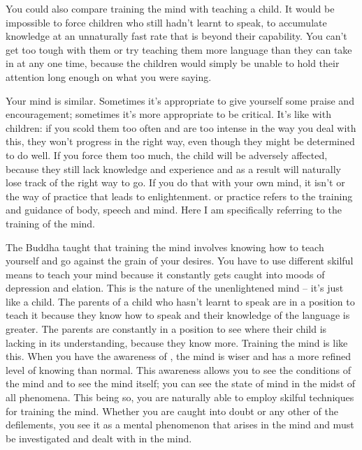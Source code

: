 You could also compare training the mind with teaching a child. It would be impossible to force children who still hadn't learnt to speak, to accumulate knowledge at an unnaturally fast rate that is beyond their capability. You can't get too tough with them or try teaching them more language than they can take in at any one time, because the children would simply be unable to hold their attention long enough on what you were saying.

Your mind is similar. Sometimes it's appropriate to give yourself some praise and encouragement; sometimes it's more appropriate to be critical. It's like with children: if you scold them too often and are too intense in the way you deal with this, they won't progress in the right way, even though they might be determined to do well. If you force them too much, the child will be adversely affected, because they still lack knowledge and experience and as a result will naturally lose track of the right way to go. If you do that with your own mind, it isn't  or the way of practice that leads to enlightenment.  or practice refers to the training and guidance of body, speech and mind. Here I am specifically referring to the training of the mind.

The Buddha taught that training the mind involves knowing how to teach yourself and go against the grain of your desires. You have to use different skilful means to teach your mind because it constantly gets caught into moods of depression and elation. This is the nature of the unenlightened mind -- it's just like a child. The parents of a child who hasn't learnt to speak are in a position to teach it because they know how to speak and their knowledge of the language is greater. The parents are constantly in a position to see where their child is lacking in its understanding, because they know more. Training the mind is like this. When you have the awareness of , the mind is wiser and has a more refined level of knowing than normal. This awareness allows you to see the conditions of the mind and to see the mind itself; you can see the state of mind in the midst of all phenomena. This being so, you are naturally able to employ skilful techniques for training the mind. Whether you are caught into doubt or any other of the defilements, you see it as a mental phenomenon that arises in the mind and must be investigated and dealt with in the mind.

